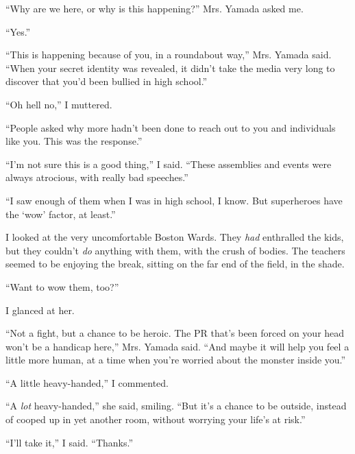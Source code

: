 ``Why are we here, or why is this happening?'' Mrs. Yamada asked me.



``Yes.''



``This is happening because of you, in a roundabout way,'' Mrs. Yamada said.  ``When your secret identity was revealed, it didn't take the media very long to discover that you'd been bullied in high school.''



``Oh hell no,'' I muttered.



``People asked why more hadn't been done to reach out to you and individuals like you.  This was the response.''



``I'm not sure this is a good thing,'' I said.  ``These assemblies and events were always atrocious, with really bad speeches.''



``I saw enough of them when I was in high school, I know.  But superheroes have the `wow' factor, at least.''



I looked at the very uncomfortable Boston Wards.  They \emph{had} enthralled the kids, but they couldn't \emph{do }anything with them, with the crush of bodies.  The teachers seemed to be enjoying the break, sitting on the far end of the field, in the shade.



``Want to wow them, too?''



I glanced at her.



``Not a fight, but a chance to be heroic.  The PR that's been forced on your head won't be a handicap here,'' Mrs. Yamada said.  ``And maybe it will help you feel a little more human, at a time when you're worried about the monster inside you.''



``A little heavy-handed,'' I commented.



``A \emph{lot} heavy-handed,'' she said, smiling.  ``But it's a chance to be outside, instead of cooped up in yet another room, without worrying your life's at risk.''



``I'll take it,'' I said.  ``Thanks.''



